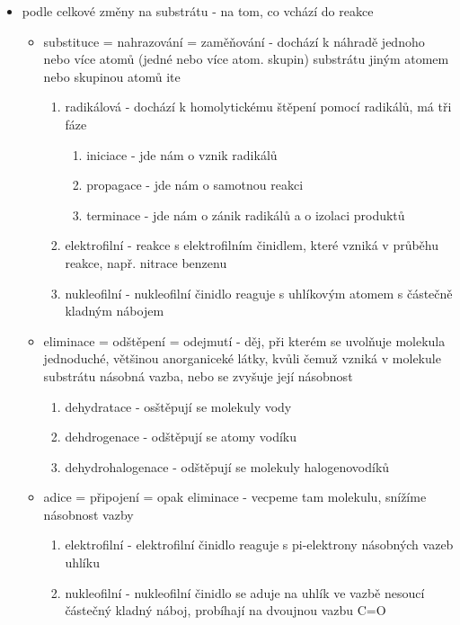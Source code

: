 \documentclass{article}
\begin{document}
\begin{itemize}
\begin{itemize}
\begin{itemize}
      \item podle celkové změny na substrátu - na tom, co vchází do reakce
      \begin{itemize}
        \item substituce = nahrazování = zaměňování - dochází k náhradě jednoho nebo více atomů (jedné nebo více atom. skupin) substrátu jiným atomem nebo skupinou atomů
        ite
        \begin{enumerate}
        \item radikálová - dochází k homolytickému štěpení pomocí radikálů, má tři fáze
        \begin{enumerate}
          \item iniciace - jde nám o vznik radikálů
          \item propagace - jde nám o samotnou reakci
          \item terminace - jde nám o zánik radikálů a o izolaci produktů
        \end{enumerate}
        \item elektrofilní - reakce s elektrofilním činidlem, které vzniká v průběhu reakce, např. nitrace benzenu
        \item nukleofilní - nukleofilní činidlo reaguje s uhlíkovým atomem s částečně kladným nábojem
        \end{enumerate}
        \item eliminace = odštěpení = odejmutí - děj, při kterém se uvolňuje molekula jednoduché, většinou anorganiceké látky, kvůli čemuž vzniká v molekule substrátu násobná vazba, nebo se zvyšuje její násobnost
        \begin{enumerate}
          \item dehydratace - osštěpují se molekuly vody
          \item dehdrogenace - odštěpují se atomy vodíku
          \item dehydrohalogenace - odštěpují se molekuly halogenovodíků
        \end{enumerate}
        \item adice = připojení = opak eliminace - vecpeme tam molekulu, snížíme násobnost vazby
        \begin{enumerate}
          \item elektrofilní - elektrofilní činidlo reaguje s pi-elektrony násobných vazeb uhlíku
          \item nukleofilní - nukleofilní činidlo se aduje na uhlík ve vazbě nesoucí částečný kladný náboj, probíhají na dvoujnou vazbu C=O
        \end{enumerate}

\end{itemize}
\end{itemize}
\end{itemize}
\end{itemize}
\end{document}
